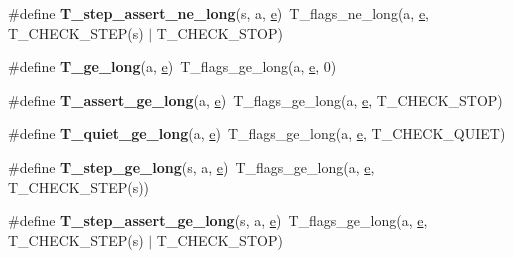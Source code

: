 \begin{DoxyCompactItemize}
\#define {\bfseries T\+\_\+step\+\_\+assert\+\_\+ne\+\_\+long}(s,  a,  \mbox{\hyperlink{sun4u_2tte_8h_a8b0b9ed08e0e18920ec2682f48228c27}{e}})~T\+\_\+flags\+\_\+ne\+\_\+long(a, \mbox{\hyperlink{sun4u_2tte_8h_a8b0b9ed08e0e18920ec2682f48228c27}{e}}, T\+\_\+\+C\+H\+E\+C\+K\+\_\+\+S\+T\+EP(s) $\vert$ T\+\_\+\+C\+H\+E\+C\+K\+\_\+\+S\+T\+OP)
\item 
\mbox{\label{group__RTEMSTestFrameworkChecksLong_ga0b4b7b8fb2496662b32ed516f0ac3a71}} 
\#define {\bfseries T\+\_\+ge\+\_\+long}(a,  \mbox{\hyperlink{sun4u_2tte_8h_a8b0b9ed08e0e18920ec2682f48228c27}{e}})~T\+\_\+flags\+\_\+ge\+\_\+long(a, \mbox{\hyperlink{sun4u_2tte_8h_a8b0b9ed08e0e18920ec2682f48228c27}{e}}, 0)
\item 
\mbox{\label{group__RTEMSTestFrameworkChecksLong_ga10a682f73878f403bac97d19f57ce1c1}} 
\#define {\bfseries T\+\_\+assert\+\_\+ge\+\_\+long}(a,  \mbox{\hyperlink{sun4u_2tte_8h_a8b0b9ed08e0e18920ec2682f48228c27}{e}})~T\+\_\+flags\+\_\+ge\+\_\+long(a, \mbox{\hyperlink{sun4u_2tte_8h_a8b0b9ed08e0e18920ec2682f48228c27}{e}}, T\+\_\+\+C\+H\+E\+C\+K\+\_\+\+S\+T\+OP)
\item 
\mbox{\label{group__RTEMSTestFrameworkChecksLong_ga9347664aa99e86eb34f2375c6f4f3c42}} 
\#define {\bfseries T\+\_\+quiet\+\_\+ge\+\_\+long}(a,  \mbox{\hyperlink{sun4u_2tte_8h_a8b0b9ed08e0e18920ec2682f48228c27}{e}})~T\+\_\+flags\+\_\+ge\+\_\+long(a, \mbox{\hyperlink{sun4u_2tte_8h_a8b0b9ed08e0e18920ec2682f48228c27}{e}}, T\+\_\+\+C\+H\+E\+C\+K\+\_\+\+Q\+U\+I\+ET)
\item 
\mbox{\label{group__RTEMSTestFrameworkChecksLong_ga0e83b7017ec4d6f9d1da69832950a3ed}} 
\#define {\bfseries T\+\_\+step\+\_\+ge\+\_\+long}(s,  a,  \mbox{\hyperlink{sun4u_2tte_8h_a8b0b9ed08e0e18920ec2682f48228c27}{e}})~T\+\_\+flags\+\_\+ge\+\_\+long(a, \mbox{\hyperlink{sun4u_2tte_8h_a8b0b9ed08e0e18920ec2682f48228c27}{e}}, T\+\_\+\+C\+H\+E\+C\+K\+\_\+\+S\+T\+EP(s))
\item 
\mbox{\label{group__RTEMSTestFrameworkChecksLong_ga66a9320d5ad4b433da942c19a64e3b93}} 
\#define {\bfseries T\+\_\+step\+\_\+assert\+\_\+ge\+\_\+long}(s,  a,  \mbox{\hyperlink{sun4u_2tte_8h_a8b0b9ed08e0e18920ec2682f48228c27}{e}})~T\+\_\+flags\+\_\+ge\+\_\+long(a, \mbox{\hyperlink{sun4u_2tte_8h_a8b0b9ed08e0e18920ec2682f48228c27}{e}}, T\+\_\+\+C\+H\+E\+C\+K\+\_\+\+S\+T\+EP(s) $\vert$ T\+\_\+\+C\+H\+E\+C\+K\+\_\+\+S\+T\+OP)

\end{DoxyCompactItemize}
